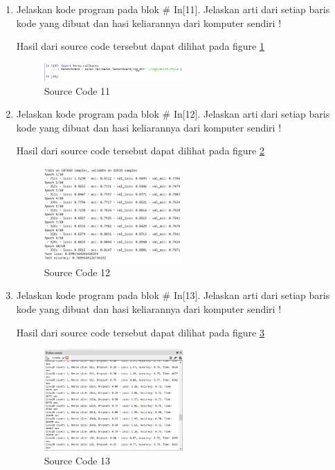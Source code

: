 \begin{enumerate}
\item Jelaskan kode program pada blok \# In[11]. Jelaskan arti dari setiap baris kode yang dibuat dan hasi keliarannya dari komputer sendiri !
	
	\subitem Hasil dari source code tersebut dapat dilihat pada figure \ref{YNC7-19}
	\begin{figure}[!htbp!]
		\centerline{\includegraphics[width=0.5\textwidth]{figures/YN/Chapter7/YNC7-19.png}}
		\caption{Source Code 11}
		\label{YNC7-19}
	\end{figure}

\item Jelaskan kode program pada blok \# In[12]. Jelaskan arti dari setiap baris kode yang dibuat dan hasi keliarannya dari komputer sendiri !
	
	\subitem Hasil dari source code tersebut dapat dilihat pada figure \ref{YNC7-20}
	\begin{figure}[!htbp!]
		\centerline{\includegraphics[width=0.5\textwidth]{figures/YN/Chapter7/YNC7-20.png}}
		\caption{Source Code 12}
		\label{YNC7-20}
	\end{figure}

\item Jelaskan kode program pada blok \# In[13]. Jelaskan arti dari setiap baris kode yang dibuat dan hasi keliarannya dari komputer sendiri !
	
	\subitem Hasil dari source code tersebut dapat dilihat pada figure \ref{YNC7-21}
	\begin{figure}[!htbp!]
		\centerline{\includegraphics[width=0.5\textwidth]{figures/YN/Chapter7/YNC7-21.png}}
		\caption{Source Code 13}
		\label{YNC7-21}
	\end{figure}


\end{enumerate}
